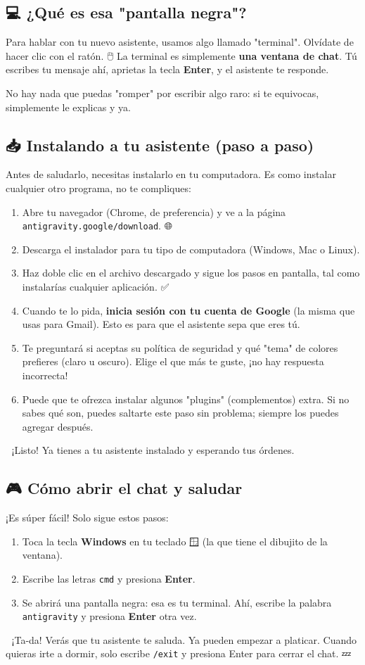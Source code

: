 \documentclass[12pt]{article}
\begin{document}
\subsection{💻 ¿Qué es esa "pantalla negra"?}
Para hablar con tu nuevo asistente, usamos algo llamado "terminal". Olvídate de hacer clic con el ratón. 🖱️ La terminal es simplemente \textbf{una ventana de chat}. Tú escribes tu mensaje ahí, aprietas la tecla \textbf{Enter}, y el asistente te responde. 💬

No hay nada que puedas "romper" por escribir algo raro: si te equivocas, simplemente le explicas y ya. 🙂

\subsection{📥 Instalando a tu asistente (paso a paso)}
Antes de saludarlo, necesitas instalarlo en tu computadora. Es como instalar cualquier otro programa, no te compliques:

\begin{enumerate}
    \item Abre tu navegador (Chrome, de preferencia) y ve a la página \texttt{antigravity.google/download}. 🌐
    \item Descarga el instalador para tu tipo de computadora (Windows, Mac o Linux).
    \item Haz doble clic en el archivo descargado y sigue los pasos en pantalla, tal como instalarías cualquier aplicación. ✅
    \item Cuando te lo pida, \textbf{inicia sesión con tu cuenta de Google} (la misma que usas para Gmail). Esto es para que el asistente sepa que eres tú. 🔑
    \item Te preguntará si aceptas su política de seguridad y qué "tema" de colores prefieres (claro u oscuro). Elige el que más te guste, ¡no hay respuesta incorrecta! 🎨
    \item Puede que te ofrezca instalar algunos "plugins" (complementos) extra. Si no sabes qué son, puedes saltarte este paso sin problema; siempre los puedes agregar después.
\end{enumerate}
🎉 ¡Listo! Ya tienes a tu asistente instalado y esperando tus órdenes.

\subsection{🎮 Cómo abrir el chat y saludar}
¡Es súper fácil! Solo sigue estos pasos:
\begin{enumerate}
    \item Toca la tecla \textbf{Windows} en tu teclado 🪟 (la que tiene el dibujito de la ventana).
    \item Escribe las letras \texttt{cmd} y presiona \textbf{Enter}.
    \item Se abrirá una pantalla negra: esa es tu terminal. Ahí, escribe la palabra \texttt{antigravity} y presiona \textbf{Enter} otra vez.
\end{enumerate}
🎉 ¡Ta-da! Verás que tu asistente te saluda. Ya pueden empezar a platicar. Cuando quieras irte a dormir, solo escribe \texttt{/exit} y presiona Enter para cerrar el chat. 💤
\end{document}
